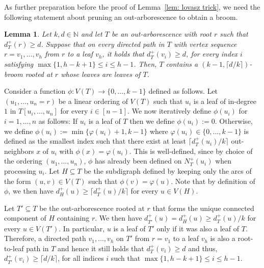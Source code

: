 \documentclass[a4paper,11pt]{article}
\makeatletter
\renewenvironment{proof}[1][\proofname] {\par\pushQED{\qed}\normalfont\topsep6\p@\@plus6\p@\relax\trivlist\item[\hskip\labelsep\bfseries#1\@addpunct{.}]\ignorespaces}{\popQED\endtrivlist\@endpefalse}
\newtheorem{lemma}[theorem]{\bf Lemma}
\theoremstyle{definition}
\makeatother
\begin{document}
As further preparation before the proof of Lemma~\ref{lem: lovasz trick}, we need the following statement about pruning an out-arborescence to obtain a broom.
\begin{lemma}\label{lem: get broom from degrees}
    Let $k, d\in \mathbb{N}$ and let $T$ be an out-arborescence with root $r$ such that $d_T^+(r) \geq d$. Suppose that on every directed path in $T$ with vertex sequence $r=v_1,\ldots,v_h$ from $r$ to a leaf $v_h$, it holds that $d_T^+(v_i)\geq d$, for every index $i$ satisfying $\max\{1,h-k+1\}\leq i\leq h-1$. Then, $T$ contains a $(k-1,\lceil d/k\rceil)$-broom rooted at $r$ whose leaves are leaves of $T$.
\end{lemma}
\begin{proof}
    Consider a function $\phi: V(T)\to\{0,\ldots,k-1\}$ defined as follows. Let $(u_1,\ldots,u_n=r)$ be a linear ordering of $V(T)$ such that $u_i$ is a leaf of in-degree $1$ in $T[u_i,\ldots,u_n]$ for every $i\in [n-1]$. We now iteratively define $\phi(u_i)$ for $i=1,\ldots,n$ as follows: If $u_i$ is a leaf of $T$ then we define $\phi(u_i):=0$. Otherwise, we define $\phi(u_i):=\min\{\varphi(u_i)+1,k-1\}$ where $\varphi(u_i)\in \{0,\ldots,k-1\}$ is defined as the smallest index such that there exist at least $\lceil d_T^+(u_i)/k\rceil$ out-neighbors $x$ of $u_i$ with $\phi(x)=\varphi(u_i)$. This is well-defined, since by choice of the ordering $(u_1,\ldots,u_n)$, $\phi$ has already been defined on $N_T^+(u_i)$ when processing $u_i$. Let $H\subseteq T$ be the subdigraph defined by keeping only the arcs of the form $(u,v)\in V(T)$ such that $\phi(v)=\varphi(u)$. Note that by definition of $\phi$, we then have $d_H^+(u)\ge \lceil d_T^+(u)/k\rceil$ for every $u\in V(H)$.
    
    Let $T'\subseteq T$ be the out-arborescence rooted at $r$ that forms the unique connected component of $H$ containing $r$. We then have $d_{T'}^+(u)=d_{H}^+(u)\geq d_T^+(u)/k$ for every $u\in V(T')$. In particular, $u$ is a leaf of $T'$ only if it was also a leaf of $T$. Therefore, a directed path $v_1,\ldots,v_h$ on $T'$ from $r=v_1$ to a leaf $v_h$ is also a root-to-leaf path in $T$ and hence it still holds that $d_T^+(v_i)\ge d$ and thus, $d_{T'}^+(v_i)\ge \lceil d/k\rceil$, for all indices $i$ such that $\max\{1,h-k+1\}\leq i\leq h-1$. 
    

\end{proof}
\end{document}
